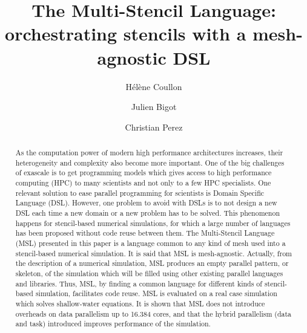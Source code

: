 \documentclass[smallextended]{svjour3}       %
\begin{document}
\title{The Multi-Stencil Language: orchestrating stencils with a mesh-agnostic DSL}


\author{H\'el\`ene Coullon \and Julien Bigot \and Christian Perez}





\maketitle

\begin{abstract}
As the computation power of modern high performance architectures increases, their heterogeneity and complexity also become more important. One of the big challenges of exascale is to get programming models which gives access to high performance computing (HPC) to many scientists and not only to a few HPC specialists. One relevant solution to ease parallel programming for scientists is Domain Specific Language (DSL). However, one problem to avoid with DSLs is to not design a new DSL each time a new domain or a new problem has to be solved. This phenomenon happens for stencil-based numerical simulations, for which a large number of languages has been proposed without code reuse between them. The Multi-Stencil Language (MSL) presented in this paper is a language common to any kind of mesh used into a stencil-based numerical simulation. It is said that MSL is mesh-agnostic. Actually, from the description of a numerical simulation, MSL produces an empty parallel pattern, or skeleton, of the simulation which will be filled using other existing parallel languages and libraries. Thus, MSL, by finding a common language for different kinds of stencil-based simulation, facilitates code reuse. MSL is evaluated on a real case simulation which solves shallow-water equations. It is shown that MSL does not introduce overheads on data parallelism up to 16.384 cores, and that the hybrid parallelism (data and task) introduced improves performance of the simulation.

\end{abstract}
\end{document}

